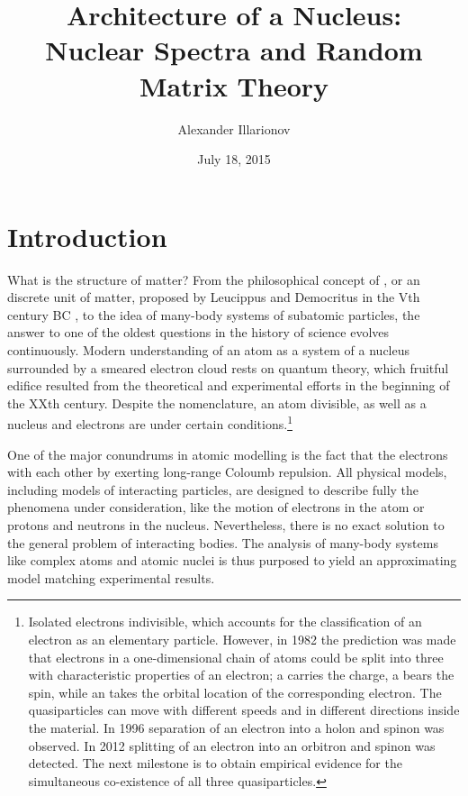 
\usepackage{float}
\graphicspath{ {images/} }
%

%


\title{Architecture of a Nucleus:\\Nuclear Spectra and Random Matrix Theory}
\author{Alexander Illarionov}
\date{July 18, 2015}
\maketitle
%
\section*{Introduction}

What is the structure of matter? From the philosophical concept of , or an  discrete unit of matter, proposed by Leucippus and Democritus in the Vth century BC \cite{ato}, to the idea of many-body systems of subatomic particles, the answer to one of the oldest questions in the history of science evolves continuously. Modern understanding of an atom as a system of a nucleus surrounded by a smeared electron cloud rests on quantum theory, which fruitful edifice resulted from the theoretical and experimental efforts in the beginning of the XXth century. Despite the nomenclature, an atom  divisible, as well as a nucleus and electrons are under certain conditions.\footnote{Isolated electrons  indivisible, which accounts for the classification of an electron as an elementary particle. However, in 1982 the prediction was made that electrons in a one-dimensional chain of atoms could be split into three  with characteristic properties of an electron; a  carries the charge, a  bears the spin, while an  takes the orbital location of the corresponding electron.\cite{kugel} The quasiparticles can move with different speeds and in different directions inside the material.\cite{merali} In 1996 separation of an electron into a holon and spinon was observed.\cite{kim} In 2012 splitting of an electron into an orbitron and spinon was detected.\cite{spin} The next milestone is to obtain empirical evidence for the simultaneous co-existence of all three quasiparticles.}

One of the major conundrums in atomic modelling is the fact that the electrons  with each other by exerting long-range Coloumb repulsion. All physical models, including models of interacting particles, are designed to describe fully the phenomena under consideration, like the motion of electrons in the atom or protons and neutrons in the nucleus. Nevertheless, there is no exact solution to the general problem of  interacting bodies.\cite{nbody} The analysis of many-body systems like complex atoms and atomic nuclei is thus purposed to yield an approximating model matching experimental results.

